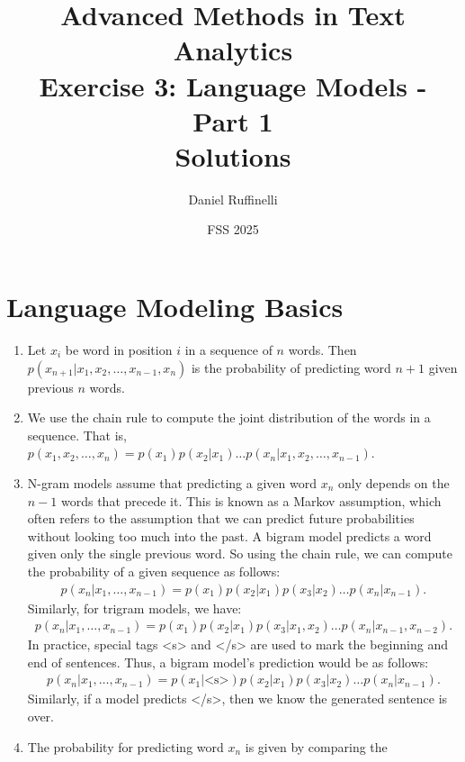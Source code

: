 \documentclass[11pt,a4paper]{article}
\title{Advanced Methods in Text Analytics \\ 
Exercise 3: Language Models - Part 1 \\
\textbf{Solutions}}
\author{Daniel Ruffinelli}
\date{FSS 2025}
\begin{document}
\maketitle

\section{Language Modeling Basics}

\begin{enumerate}[label=(\alph*)]
    \item Let $x_i$ be word in position $i$ in a sequence of $n$ words. Then
          $p(x_{n+1}|x_1, x_2, \ldots, x_{n-1}, x_{n})$ is the probability of
          predicting word $n+1$ given previous $n$ words.
    \item We use the chain rule to compute the joint distribution of the words
          in a sequence.
          That is,
          $p(x_1, x_2, \ldots, x_n) = p(x_1)p(x_2|x_1)\ldots p(x_n|x_1,x_2,\ldots,x_{n-1})$.
    \item N-gram models assume that predicting a given word $x_n$ only depends
          on the $n-1$ words that precede it.
          This is known as a Markov assumption, which often refers to the
          assumption that we can predict future probabilities without looking
          too much into the past.
          A bigram model predicts a word given only the single previous word.
          So using the chain rule, we can compute the probability of a given
          sequence as follows:
          \begin{align*}
              p(x_n|x_1,\ldots,x_{n-1}) = p(x_1)p(x_2|x_1)p(x_3|x_2)\ldots p(x_n|x_{n-1}).
          \end{align*}
          Similarly, for trigram models, we have:
          \begin{align*}
              p(x_n|x_1,\ldots,x_{n-1}) = p(x_1)p(x_2|x_1)p(x_3|x_1,x_2)\ldots p(x_n|x_{n-1},x_{n-2}).
          \end{align*}
          In practice, special tags <s> and </s> are used to mark the beginning
          and end of sentences.
          Thus, a bigram model's prediction would be as follows:
          \begin{align*}
              p(x_n|x_1,\ldots,x_{n-1}) = p(x_1|\text{<s>})p(x_2|x_1)p(x_3|x_2)\ldots p(x_n|x_{n-1}).
          \end{align*}
          Similarly, if a model predicts </s>, then we know the generated
          sentence is over.
    \item The probability for predicting word $x_n$ is given by comparing the

\end{enumerate}
\end{document}
